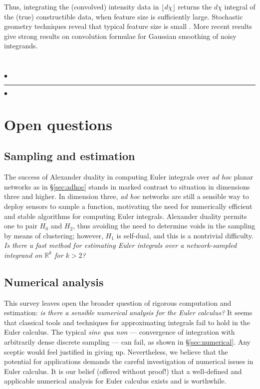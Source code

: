 \documentclass{psapm-l}
\theoremstyle{definition}
\theoremstyle{remark}
\numberwithin{equation}{section}
\begin{document}
Thus, integrating the (convolved) intensity data in ${{\lfloor d\chi\rfloor}}$ returns the $d\chi$ integral of the (true) constructible data, when feature size is sufficiently large. Stochastic geometry techniques reveal that typical feature size is small \cite{BG:PNAS}. More recent results \cite{BoBo} give strong results on convolution formulae for Gaussian smoothing of noisy integrands.

\
{
\begin{center}
\nointerlineskip\vspace{-0.04in}
        $\bullet$\hfill\rule{0.77\linewidth}{1.0pt}\hfill$\bullet$
\par\nointerlineskip\vspace{-0.01in}
\end{center}
}
\vspace{0.1in}

\section{Open questions}
\label{sec:open}

\subsection{Sampling and estimation}
The success of Alexander duality in computing Euler integrals over {\em ad hoc} planar networks as in \S\ref{sec:adhoc} stands in marked contrast to situation in dimensions three and higher. In dimension three, {\em ad hoc} networks are still a sensible way to deploy sensors to sample a function, motivating the need for numerically efficient and stable algorithms for computing Euler integrals. Alexander duality permits one to pair $H_0$ and $H_2$, thus avoiding the need to determine voids in the sampling by means of clustering; however, $H_1$ is self-dual, and this is a nontrivial difficulty. {\em Is there a fast method for estimating Euler integrals over a network-sampled integrand on ${{\mathbb R}}^k$ for $k>2$?}

\subsection{Numerical analysis}
This survey leaves open the broader question of rigorous computation and estimation: {\em is there a sensible numerical analysis for the Euler calculus?} It seems that classical tools and techniques for approximating integrals fail to hold in the Euler calculus. The typical {\em sine qua non} --- convergence of integration with arbitrarily dense discrete sampling --- can fail, as shown in \S\ref{sec:numerical}. Any sceptic would feel justified in giving up. Nevertheless, we believe that the potential for applications demands the careful investigation of numerical issues in Euler calculus. It is our belief (offered without proof!) that a well-defined and applicable numerical analysis for Euler calculus exists and is worthwhile.
\end{document}
